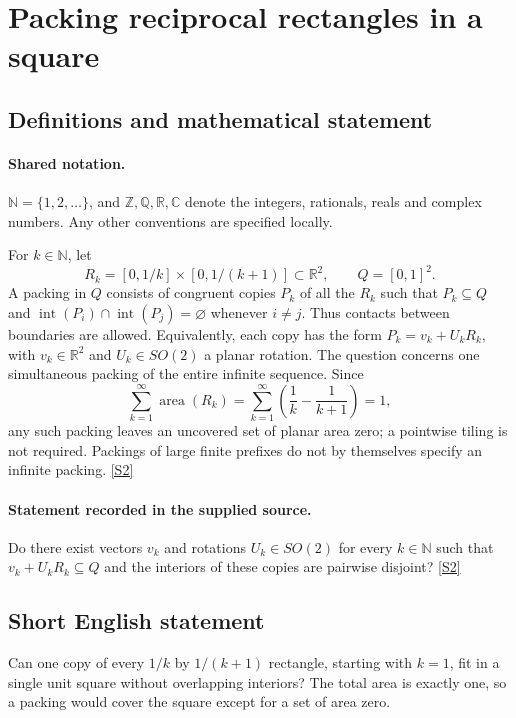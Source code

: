 \documentclass[11pt]{book}
\newcommand{\sref}[2]{\hyperlink{source:#1:#2}{[S#2]}}
\begin{document}
\section{Packing reciprocal rectangles in a square}\label{statement}

\subsection{Definitions and mathematical statement}

\paragraph{Shared notation.}$\mathbb N=\{1,2,\ldots\}$, and $\mathbb Z,\mathbb Q,\mathbb R,\mathbb C$ denote the integers, rationals, reals and complex numbers. Any other conventions are specified locally.


For $k\in\mathbb N$, let
\[
 R_k=[0,1/k]\times[0,1/(k+1)]\subset\mathbb R^2,
 \qquad Q=[0,1]^2.
\]
A packing in $Q$ consists of congruent copies $P_k$ of all the $R_k$ such that $P_k\subseteq Q$ and $\operatorname{int}(P_i)\cap\operatorname{int}(P_j)=\varnothing$ whenever $i\ne j$. Thus contacts between boundaries are allowed. Equivalently, each copy has the form $P_k=v_k+U_kR_k$, with $v_k\in\mathbb R^2$ and $U_k\in SO(2)$ a planar rotation. The question concerns one simultaneous packing of the entire infinite sequence.
Since
\[
 \sum_{k=1}^{\infty}\operatorname{area}(R_k)
 =\sum_{k=1}^{\infty}\left(\frac1k-\frac1{k+1}\right)=1,
\]
any such packing leaves an uncovered set of planar area zero; a pointwise tiling is not required. Packings of large finite prefixes do not by themselves specify an infinite packing. \sref{statement}{2}
\paragraph{Statement recorded in the supplied source.}
Do there exist vectors $v_k$ and rotations $U_k\in SO(2)$ for every $k\in\mathbb N$ such that $v_k+U_kR_k\subseteq Q$ and the interiors of these copies are pairwise disjoint? \sref{statement}{2}
\subsection{Short English statement}
Can one copy of every $1/k$ by $1/(k+1)$ rectangle, starting with $k=1$, fit in a single unit square without overlapping interiors? The total area is exactly one, so a packing would cover the square except for a set of area zero.
\end{document}
